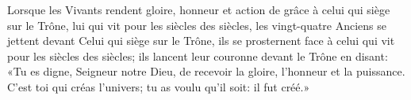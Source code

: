 Lorsque les Vivants rendent gloire, honneur et action de grâce
		à celui qui siège sur le Trône,
	lui qui vit pour les siècles des siècles,
	les vingt-quatre Anciens se jettent devant Celui qui siège sur le Trône,
	ils se prosternent face à celui qui vit pour les siècles des siècles;
	ils lancent leur couronne devant le Trône en disant:
	«Tu es digne, Seigneur notre Dieu,
	de recevoir la gloire, l’honneur et la puissance.
C’est toi qui créas l’univers;
	tu as voulu qu’il soit: il fut créé.»
